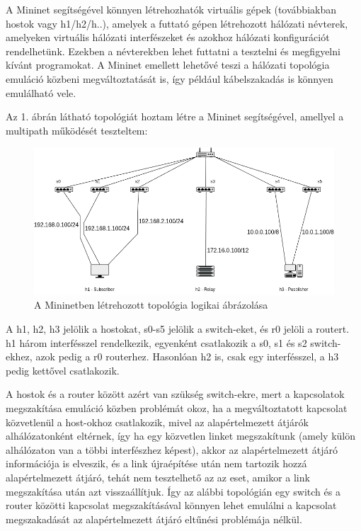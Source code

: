 \documentclass[a4paper,oneside]{article}
\begin{document}
A Mininet segítségével könnyen létrehozhatók virtuális gépek (továbbiakban hostok vagy h1/h2/h..), 
amelyek a futtató gépen létrehozott hálózati névterek, amelyeken virtuális
hálózati interfészeket és azokhoz hálózati konfigurációt rendelhetünk.
Ezekben a névterekben lehet futtatni a tesztelni és megfigyelni kívánt programokat.
A Mininet emellett lehetővé teszi a hálózati topológia 
emuláció közbeni megváltoztatását is, így például kábelszakadás 
is könnyen emulálható vele. \cite{mininet}

Az 1. ábrán látható topológiát hoztam létre a Mininet segítségével, amellyel a multipath működését teszteltem:

\begin{figure}[h]
  \centering
    \includegraphics[width=15cm]{topoX}
\caption{A Mininetben létrehozott topológia logikai ábrázolása}
\end{figure}
 
A h1, h2, h3 jelölik a hostokat, s0-s5 jelölik a switch-eket, és r0 jelöli a routert.
h1 három interfésszel rendelkezik, egyenként csatlakozik a s0, s1 és s2 switch-ekhez, azok pedig a r0 routerhez.
Hasonlóan h2 is, csak egy interfésszel, a h3 pedig kettővel csatlakozik.

A hostok és a router között azért van szükség switch-ekre,
mert a kapcsolatok megszakítása emuláció közben problémát okoz, ha a megváltoztatott kapcsolat közvetlenül a host-okhoz csatlakozik, 
mivel az alapértelmezett átjárók alhálózatonként eltérnek, így ha egy közvetlen linket megszakítunk (amely külön alhálózaton van a többi interfészhez képest), 
akkor az alapértelmezett átjáró információja is elveszik, és a link újraépítése után nem tartozik hozzá alapértelmezett átjáró, tehát nem tesztelhető 
az az eset, amikor a link megszakítása után azt visszaállítjuk.
Így az alábbi topológián egy switch és a router közötti kapcsolat megszakításával könnyen lehet emulálni a kapcsolat 
megszakadását az alapértelmezett átjáró eltűnési problémája nélkül.
\end{document}
